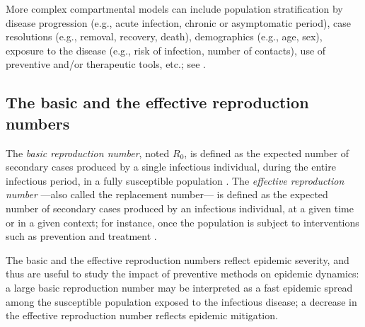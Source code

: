 More complex compartmental models can include population stratification by disease progression (e.g., acute infection, chronic or asymptomatic period), case resolutions (e.g., removal, recovery, death), demographics (e.g., age, sex), exposure to the disease (e.g., risk of infection, number of contacts), use of preventive and/or therapeutic tools, etc.; see \cite{Hethcote2000}. 


\subsection{The basic and the effective reproduction numbers}
\label{Intro:ReproductionNumbers}

The \textit{basic reproduction number}, noted $R_0$, is defined as the expected number of secondary cases produced by a single infectious individual, during the entire infectious period, in a fully susceptible population \cite[]{Anderson1991,Heesterbeek2002}. The \textit{effective reproduction number} ---also called the replacement number--- is defined as the expected number of secondary cases produced by an infectious individual, at a given time or in a given context; for instance, once the population is subject to interventions such as prevention and treatment \cite[]{Ridenhour2018,VanDenDriessche2008,VanDenDriessche2002,Hethcote2000}. %

The basic and the effective reproduction numbers reflect epidemic severity, and thus are useful to study the impact of preventive methods on epidemic dynamics: a large basic reproduction number may be interpreted as a fast epidemic spread among the susceptible population exposed to the infectious disease; a decrease in the effective reproduction number reflects epidemic mitigation. 

